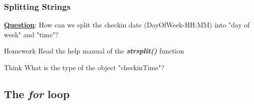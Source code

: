 \documentclass[12pt]{book}\usepackage{knitr}
\begin{document}
\subsubsection{Splitting Strings}
\noindent \textbf{\underline{Question}}: How can we split the checkin date (DayOfWeek-HH:MM) into "day of week" and "time"?
\begin{knitrout}
\color{fgcolor}\begin{kframe}
\begin{alltt}
 \hlkwb{<-} \hlopt{$} \hlstd{=} \hlstd{)}
\end{alltt}
\end{kframe}
\end{knitrout}

\begin{DIY}{Homework}
\noindent Read the help manual of the \textbf{\emph{strsplit()}} function
\end{DIY}

\begin{DIY}{Think}
\noindent What is the type of the object "checkinTime"? 
\end{DIY}

\newpage
\subsection{The \textbf{\emph{for}} loop}
\begin{HIGHLIGHT}
\par{}
\end{HIGHLIGHT}
\end{document}
